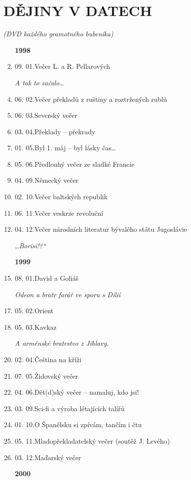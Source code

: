 \section{DĚJINY V DATECH}

\noindent
\textit{(DVD každého gramotného bubeníka)}

\begin{enumerate}
 \item[\textbf{1998}]
 \item 09. 01.\quad Večer L. a R. Pellarových
 \item[] \textit{A tak to začalo}\ldots
 \item 06. 02.\quad Večer překladů z ruštiny a roztržených rublů
 \item 06. 03.\quad Severský večer
 \item 03. 04.\quad Překlady -- překrady
 \item 01. 05.\quad Byl 1. máj -- byl lásky čas\ldots
 \item 05. 06.\quad Předlouhý večer ze sladké Francie
 \item 04. 09.\quad Německý večer
 \item 02. 10.\quad Večer baltských republik
 \item 06. 11.\quad Večer veskrze revoluční
 \item 04. 12.\quad Večer národních literatur bývalého státu Jugoslávie 
 \item[] \textit{,,Borisi!?``}
 \item[\textbf{1999}]
 \item 08. 01.\quad David a Goliáš 
 \item[] \textit{Odeon a bratr farář ve sporu s Dilií}
 \item 05. 02.\quad Orient
 \item 05. 03.\quad Kavkaz 
 \item[] \textit{A arménské bratrstvo z Jihlavy.}
 \item 02. 04.\quad Čeština na kříži
 \item 07. 05.\quad Židovský večer
 \item 04. 06.\quad Dět(d)ský večer -- namaluj, kdo jsi!
 \item 03. 09.\quad Sci-fi a výroba létajících talířů
 \item 01. 10.\quad O Španělsku si zpívám, tančím i čtu
 \item 05. 11.\quad Mladopřekladatelský večer (soutěž J. Levého)
 \item 03. 12.\quad Maďarský večer
 \item[\textbf{2000}]

\end{enumerate}
